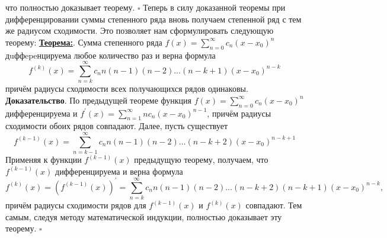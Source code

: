 \documentclass[a4paper,12pt]{article} %
\begin{document}
что полностью доказывает теорему. $\square$
Теперь в силу доказанной теоремы при дифференцировании суммы степенного ряда вновь получаем степенной ряд с тем же радиусом сходимости. Это позволяет нам сформулировать
следующую теорему:
\underline{\textbf{Теорема:}}. Сумма степенного ряда $f(x)=\sum\limits_{n=0}^{\infty} c_{n}\left(x-x_{0}\right)^{n}$ дuффepeнцируема любое количество раз и верна формула
\begin{equation*}
f^{(k)}(x)=\sum\limits_{n=k}^{\infty} c_{n} n(n-1)(n-2) \ldots(n-k+1)\left(x-x_{0}\right)^{n-k}
\end{equation*}
причём радиусы сходимости всех получающихся рядов одинаковы.
\textbf{Доказательство}. По предыдущей теореме функция $f(x)=\sum\limits_{n=0}^{\infty} c_{n}\left(x-x_{0}\right)^{n}$ дифференцируема и $f^{\prime}(x)=\sum\limits_{n=1}^{\infty} n c_{n}\left(x-x_{0}\right)^{n-1}$, причём радиусы сходимости обоих рядов совпадают. Далее, пусть существует
\begin{equation*}
f^{(k-1)}(x)=\sum\limits_{n=k-1}^{\infty} c_{n} n(n-1)(n-2) \ldots(n-k+2)\left(x-x_{0}\right)^{n-k+1}
\end{equation*}
Применяя к функции $f^{(k-1)}(x)$ предыдущую теорему, получаем, что $f^{(k-1)}(x)$ дифференцируема и верна формула
\begin{equation*}
f^{(k)}(x)=\left(f^{(k-1)}(x)\right)^{\prime}=\sum\limits_{n=k}^{\infty} c_{n} n(n-1)(n-2) \ldots(n-k+2)(n-k+1)\left(x-x_{0}\right)^{n-k},
\end{equation*}
причём радиусы сходимости рядов для $f^{(k-1)}(x)$ и $f^{(k)}(x)$ совпадают. Тем самым, следуя методу математической индукции, полностью доказывает эту теорему. $\square$
\end{document}
